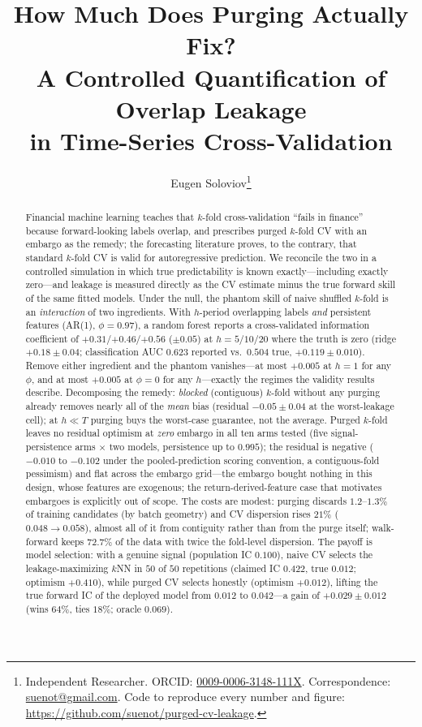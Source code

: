 \documentclass[11pt]{article}
\title{\bfseries How Much Does Purging Actually Fix?\\
A Controlled Quantification of Overlap Leakage\\ in Time-Series Cross-Validation}
\author{Eugen Soloviov\thanks{Independent Researcher. ORCID:
\href{https://orcid.org/0009-0006-3148-111X}{0009-0006-3148-111X}.
Correspondence: \href{mailto:suenot@gmail.com}{suenot@gmail.com}.
Code to reproduce every number and figure:
\url{https://github.com/suenot/purged-cv-leakage}.}}
\date{}
\begin{document}
\maketitle

\begin{abstract}
Financial machine learning teaches that $k$-fold cross-validation ``fails in
finance'' because forward-looking labels overlap, and prescribes purged
$k$-fold CV with an embargo as the remedy; the forecasting literature proves,
to the contrary, that standard $k$-fold CV is valid for autoregressive
prediction. We reconcile the two in a controlled simulation in which true
predictability is known exactly---including exactly zero---and leakage is
measured directly as the CV estimate minus the true forward skill of the same
fitted models. Under the null, the phantom skill of naive shuffled $k$-fold is
an \emph{interaction} of two ingredients. With $h$-period overlapping labels
\emph{and} persistent features (AR(1), $\phi=0.97$), a random forest reports a
cross-validated information coefficient of $+0.31$/$+0.46$/$+0.56$ ($\pm0.05$)
at $h=5/10/20$ where the truth is zero (ridge $+0.18\pm0.04$; classification
AUC $0.623$ reported vs.\ $0.504$ true, $+0.119\pm0.010$). Remove either
ingredient and the phantom vanishes---at most $+0.005$ at $h=1$ for any
$\phi$, and at most $+0.005$ at $\phi=0$ for any $h$---exactly the regimes the
validity results describe. Decomposing the remedy: \emph{blocked} (contiguous)
$k$-fold without any purging already removes nearly all of the \emph{mean}
bias (residual $-0.05\pm0.04$ at the worst-leakage cell); at $h \ll T$ purging
buys the worst-case guarantee, not the average. Purged $k$-fold leaves no
residual optimism at \emph{zero} embargo in all ten arms tested (five
signal-persistence arms $\times$ two models, persistence up to
$0.995$); the residual is negative ($-0.010$ to $-0.102$ under the
pooled-prediction scoring convention, a contiguous-fold
pessimism) and flat across the embargo grid---the embargo bought nothing in
this design, whose features are exogenous; the return-derived-feature case
that motivates embargoes is explicitly out of scope. The costs are modest:
purging discards $1.2$--$1.3\%$ of training candidates (by batch geometry)
and CV dispersion rises
$21\%$ ($0.048 \to 0.058$), almost all of it from contiguity rather than from
the purge itself; walk-forward keeps $72.7\%$ of the data with twice the
fold-level dispersion. The payoff is model selection: with a genuine signal
(population IC $0.100$), naive CV selects the leakage-maximizing $k$NN in
$50$ of $50$ repetitions (claimed IC $0.422$, true $0.012$; optimism
$+0.410$), while purged CV selects honestly (optimism $+0.012$), lifting the
true forward IC of the deployed model from $0.012$ to $0.042$---a gain of
$+0.029\pm0.012$ (wins $64\%$, ties $18\%$; oracle $0.069$).
\end{abstract}
\end{document}
